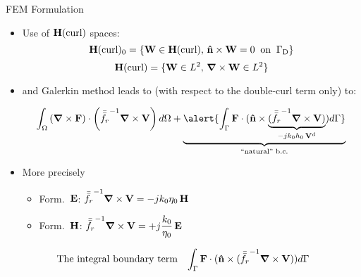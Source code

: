 \begin{frame}[allowframebreaks]{FEM Formulation}
\begin{itemize}
\begin{table}[tb]
    \end{table}

  \end{itemize}

  \framebreak  %

  \begin{itemize}\setlength{\itemsep}{0.3\baselineskip}

  \item Use of $\mathbf{H}(\text{curl})$ spaces:
%
    \begin{equation}
      \mathbf{H}(\text{curl})_0 = \lbrace \mathbf{W} \in \mathbf{H}(\text{curl}),\, \mathbf{\hat{n}} \times \mathbf{W} = 0 \;\;
      \text{on} \;\; \Gamma_{\text{D}} \rbrace
      \label{eq::hcurl_0}
    \end{equation}
    \begin{equation}
      \mathbf{H}(\text{curl}) = \lbrace \mathbf{W} \in L^2,\, \boldsymbol{\nabla} \times \mathbf{W} \in L^2 \rbrace
      \label{eq::hcurl}
    \end{equation}

  \item and Galerkin method leads to (with respect to the double-curl term only) to:


    \begin{equation*}
      \int_\Omega \left( \vnabla \times \vec{F} \right) \cdot \left( {\bar{\bar{f_r}}}^{-1}
        \vnabla \times \vec{V} \right) d\Omega 
       + 
       \underbrace{\alert{\int_{\Gamma} \vF\cdot(\normal \times \underbrace{( {\bar{\bar{f_r}}}^{-1} \vnabla \times \vec{V} )}_{-j k_0 h_0\, \vVd}) d\Gamma}}_{\text{``natural'' b.c.}}
    \end{equation*}

  \item More precisely
    \begin{itemize}
    \item Form.\ $\mathbf{E}$:
      ${\bar{\bar{f_r}}}^{-1} \boldsymbol{\nabla} \times \mathbf{V} = -jk_0\eta_0 \,\mathbf{H}$
    \item Form.\ $\mathbf{H}$:
      ${\bar{\bar{f_r}}}^{-1} \boldsymbol{\nabla} \times \mathbf{V} = +j\dfrac{k_0}{\eta_0} \,\mathbf{E}$
    \end{itemize}
    

  \end{itemize}
  
  \framebreak  %

  \begin{equation*}
    \text{The integral boundary term} \quad {\int_{\Gamma} \mathbf{F}\cdot(\mathbf{\hat{n}}\times ( {\bar{\bar{f_r}}}^{-1} \boldsymbol{\nabla}\times \mathbf{V} )) d\Gamma}
  \end{equation*}



\end{frame}
